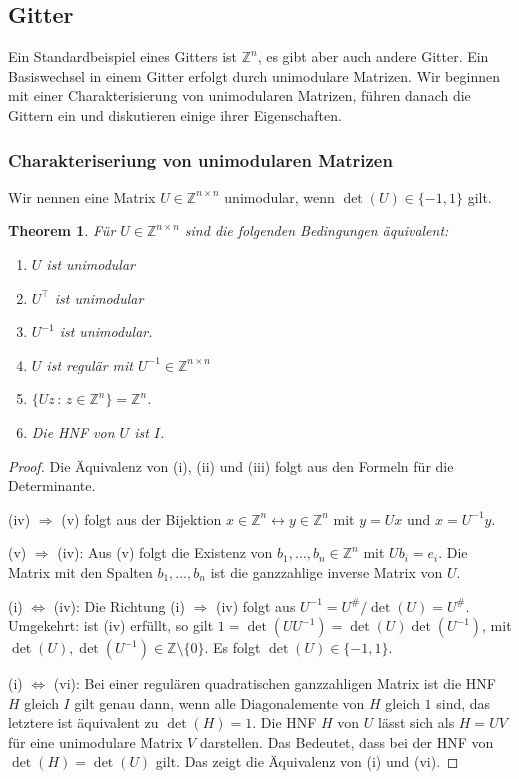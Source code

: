 \documentclass[
a4paper,landscape,16pt,
bibliography=totocnumbered,
numbers=noenddot,
]{scrartcl}
\numberwithin{equation}{subsection}
\newcommand{\Z}{\mathbb Z}
\theoremstyle{plain}
\newtheorem*{thm}{Theorem}
\theoremstyle{definition}
\begin{document}
\subsection{Gitter} 

Ein Standardbeispiel eines Gitters ist $\Z^n$, es gibt aber auch andere Gitter. Ein Basiswechsel in einem Gitter erfolgt durch unimodulare Matrizen. Wir beginnen mit einer Charakterisierung von unimodularen Matrizen, führen  danach die Gittern ein und diskutieren einige ihrer Eigenschaften. 

\subsubsection{Charakteriseriung von unimodularen Matrizen} 

Wir nennen eine Matrix $U \in \Z^{n \times n}$ unimodular, wenn $\det(U) \in \{-1,1\}$ gilt. 

\begin{thm}
		Für $U \in \Z^{n \times n}$ sind die folgenden Bedingungen äquivalent: 
		\begin{enumerate}
			\item $U$ ist unimodular
			\item $U^\top$ ist unimodular 
			\item $U^{-1}$ ist unimodular. 
			\item $U$ ist regulär mit $U^{-1} \in \Z^{n \times n}$
			\item $\{ Uz \,:\, z \in \Z^n\} = \Z^n$. 
			\item Die HNF von $U$ ist $I$. 
		\end{enumerate} 
\end{thm} 
\begin{proof}
	Die Äquivalenz von (i), (ii) und (iii) folgt aus den Formeln für die Determinante. 
	
	(iv) $\Rightarrow$ (v) folgt aus der Bijektion $x  \in \Z^n \leftrightarrow y \in \Z^n$ mit $y = U x$ und $x = U^{-1} y$. 
	
	(v) $\Rightarrow$ (iv): Aus (v) folgt die Existenz von $b_1,\ldots,b_n \in \Z^n$ mit $U b_i = e_i$. Die Matrix mit den Spalten $b_1,\ldots,b_n$ ist die ganzzahlige inverse Matrix von $U$. 

	(i) $\Leftrightarrow$ (iv): Die Richtung (i) $\Rightarrow$ (iv) folgt aus $U^{-1} = U^{\#} / \det(U) = U^{\#}$. Umgekehrt: ist (iv) erfüllt, so gilt $1= \det(U U^{-1} ) = \det(U) \det(U^{-1})$, mit $\det(U), \det(U^{-1}) \in \Z \setminus \{0\}$. Es folgt $\det(U) \in \{-1,1\}$. 
	
	(i) $\Leftrightarrow$ (vi): Bei einer regulären quadratischen ganzzahligen Matrix ist die HNF $H$ gleich $I$ gilt genau dann, wenn alle Diagonalemente von $H$ gleich $1$ sind, das letztere ist äquivalent zu $\det(H)=1$. Die HNF $H$ von $U$ lässt sich als $H = U V$ für eine unimodulare Matrix $V$ darstellen. Das Bedeutet, dass bei der HNF von $\det(H) = \det(U)$ gilt. Das zeigt die Äquivalenz von (i) und (vi).   
\end{proof} 
\end{document}
